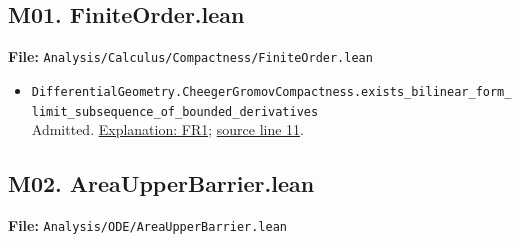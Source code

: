 \documentclass[
  letterpaper,
  11pt]{article}
\providecommand{\tightlist}{%
  \setlength{\itemsep}{0pt}\setlength{\parskip}{0pt}}
\begin{document}

\subsection{M01. FiniteOrder.lean}\label{m01.-finiteorder.lean}

\textbf{File:}
{\small\texttt{Analysis/\allowbreak{}Calculus/\allowbreak{}Compactness/\allowbreak{}Finite\allowbreak{}Order.\allowbreak{}lean}}

\begin{itemize}
\tightlist
\item
  {\small\texttt{Differential\allowbreak{}Geometry.\allowbreak{}Cheeger\allowbreak{}Gromov\allowbreak{}Compactness.\allowbreak{}exists\_\allowbreak{}bilinear\_\allowbreak{}form\_\allowbreak{}limit\_\allowbreak{}subsequence\_\allowbreak{}of\_\allowbreak{}bounded\_\allowbreak{}derivatives}}\\
  Admitted. \hyperref[fr1]{Explanation: FR1};
  \href{https://github.com/qinz1yang/differential-geometry-dev/blob/ea0fae60ee01ef8c8d9b57a51794c6538f679c5d/DifferentialGeometry/Analysis/Calculus/Compactness/FiniteOrder.lean\#L11}{source
  line 11}.
\end{itemize}


\subsection{M02.
AreaUpperBarrier.lean}\label{m02.-areaupperbarrier.lean}

\textbf{File:}
{\small\texttt{Analysis/\allowbreak{}ODE/\allowbreak{}Area\allowbreak{}Upper\allowbreak{}Barrier.\allowbreak{}lean}}
\end{document}
